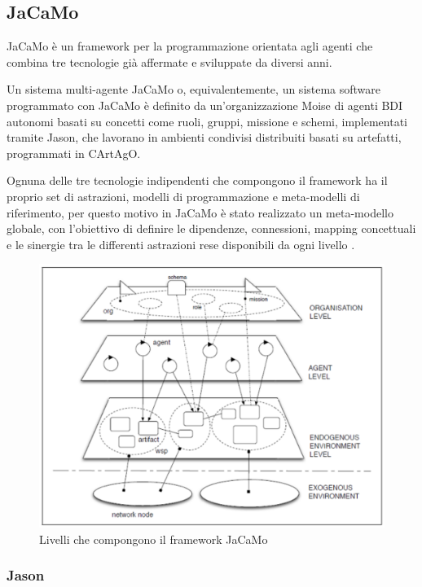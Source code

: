 \subsection{JaCaMo}

JaCaMo è un framework per la programmazione orientata agli agenti che combina tre tecnologie già affermate e sviluppate da diversi anni.

\medskip

Un sistema multi-agente JaCaMo o, equivalentemente, un sistema software programmato con JaCaMo è definito da un'organizzazione Moise di agenti BDI autonomi basati su concetti come ruoli, gruppi, missione e schemi, implementati tramite Jason, che lavorano in ambienti condivisi distribuiti basati su artefatti, programmati in CArtAgO.

\medskip

Ognuna delle tre tecnologie indipendenti che compongono il framework ha il proprio set di astrazioni, modelli di programmazione e meta-modelli di riferimento, per questo motivo in JaCaMo è stato realizzato un meta-modello globale, con l'obiettivo di definire le dipendenze, connessioni, mapping concettuali e le sinergie tra le differenti astrazioni rese disponibili da ogni livello \cite{BOISSIER2013747}.

\begin{figure}[H]
\centering
\includegraphics[width=\textwidth]{figures/JaCaMo_levels.png}
\caption{Livelli che compongono il framework JaCaMo \cite{BOISSIER2013747}}
\label{livelli_jacamo}
\end{figure}

\subsubsection{Jason} \label{jason}

